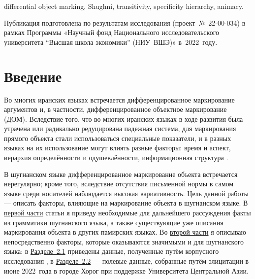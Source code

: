 \begin{eng-keywords}
differential object marking, Shughni, transitivity, specificity hierarchy, animacy.
\end{eng-keywords}

\begin{acknowledgements}
Публикация подготовлена по результатам исследования (проект~№~22-00-034) в рамках Программы «Научный фонд Национального исследовательского университета “Высшая школа экономики” (НИУ~ВШЭ)» в~2022~году.
\end{acknowledgements}

\begin{initialprint}
\end{initialprint}

\section{Введение} \label{dom-intro}

Во многих иранских языках встречается дифференцированное маркирование аргументов \parencite[63]{korn2016_dialectology} и, в частности, дифференцированное объектное маркирование (ДОМ). Вследствие того, что во многих иранских языках в ходе развития была утрачена или радикально редуцирована падежная система, для маркирования прямого объекта стали использоваться специальные показатели, и в разных языках на их использование могут влиять разные факторы: время и аспект, иерархия определённости и одушевлённости, информационная структура \parencites[33]{windfuhr2009}{bossong1985}.

В шугнанском языке дифференцированное маркирование объекта встречается нерегулярно; кроме того, вследствие отсутствия письменной нормы в самом языке среди носителей наблюдается высокая вариативность. Цель данной работы — описать факторы, влияющие на маркирование объекта в шугнанском языке. В \hyperref[dom-shughni]{первой части} статьи я приведу необходимые для дальнейшего рассуждения факты из грамматики шугнанского языка, а также существующие уже описания маркирования объекта в других памирских языках. Во \hyperref[dom-factors]{второй части} я описываю непосредственно факторы, которые оказываются значимыми и для шугнанского языка: в \hyperref[dom-corpus]{Разделе~2.1} приведены данные, полученные путём корпусного исследования \parencite{makarov_etal2022}, в \hyperref[dom-elicit]{Разделе~2.2} — полевые данные, собранные путём элицитации в июне 2022~года в городе Хорог при поддержке Университета Центральной Азии.


